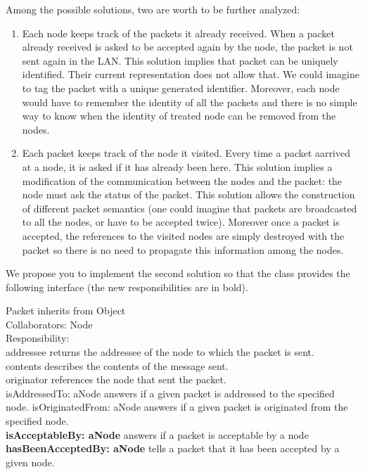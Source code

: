 Among the possible solutions, two are worth to be further analyzed:
\begin{enumerate}
\item 
Each node keeps track of the packets it already received. When 
a packet already received is asked to be accepted again by the 
node, the packet is not sent again in the LAN. This solution 
implies that packet can be uniquely identified. Their current 
representation does not allow that. We could imagine to tag the 
packet with a unique generated identifier. Moreover, each node 
would have to remember the identity of all the packets and there 
is no simple way to know when the identity of treated node can 
be removed from the nodes.
\item 
Each packet keeps track of the node it visited. Every time a 
packet aarrived at a node, it is asked if it has already been 
here. This solution implies a modification of the communication 
between the nodes and the packet: the node must ask the status 
of the packet. This solution allows the construction of different 
packet semantics (one could imagine that packets are broadcasted 
to all the nodes, or have to be accepted twice). Moreover once 
a packet is accepted, the references to the visited nodes are 
simply destroyed with the packet so there is no need to propagate 
this information among the nodes. 
\end{enumerate}

We propose you to implement the second solution so that the class 
provides the following interface (the new responsibilities are 
in bold).

\begin{code}
Packet inherits from Object\\
Collaborators: Node\\
Responsibility:\\
addressee returns the addressee of the node to which the packet 
is sent.\\
contents describes the contents of the message sent.\\
originator references the node that sent the packet.\\
isAddressedTo: aNode answers if a given packet is addressed to 
the specified node. isOriginatedFrom: aNode answers if a given 
packet is originated from the specified node. \\
\textbf{isAcceptableBy: aNode} answers if a packet is acceptable by 
a node\\
\textbf{hasBeenAcceptedBy: aNode} tells a packet that it has been 
accepted by a given node. \\
\end{code}

